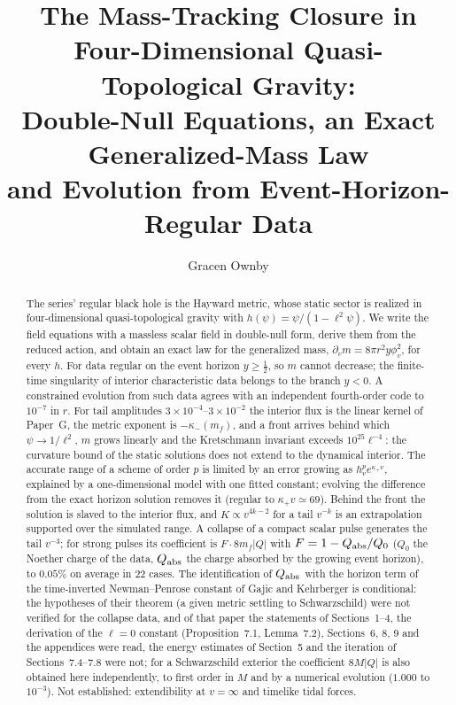 \documentclass[11pt]{article}
\title{The Mass-Tracking Closure in Four-Dimensional Quasi-Topological Gravity:\\
Double-Null Equations, an Exact Generalized-Mass Law\\
and Evolution from Event-Horizon-Regular Data}
\author{Gracen Ownby}
\date{}
\begin{document}
\maketitle

\begin{abstract}
The series' regular black hole is the Hayward metric, whose static sector is realized in four-dimensional quasi-topological gravity with $h(\psi)=\psi/(1-\ell^{2}\psi)$. We write the field equations with a massless scalar field in double-null form, derive them from the reduced action, and obtain an exact law for the generalized mass, $\partial_vm=8\pi r^{2}y\phi_v^{2}$, for every $h$. For data regular on the event horizon $y\ge\tfrac12$, so $m$ cannot decrease; the finite-time singularity of interior characteristic data belongs to the branch $y<0$. A constrained evolution from such data agrees with an independent fourth-order code to $10^{-7}$ in $r$. For tail amplitudes $3\times10^{-4}$--$3\times10^{-2}$ the interior flux is the linear kernel of Paper~G, the metric exponent is $-\kappa_-(m_f)$, and a front arrives behind which $\psi\to1/\ell^{2}$, $m$ grows linearly and the Kretschmann invariant exceeds $10^{25}\ell^{-4}$: the curvature bound of the static solutions does not extend to the dynamical interior. The accurate range of a scheme of order $p$ is limited by an error growing as $h_v^{p}e^{\kappa_+v}$, explained by a one-dimensional model with one fitted constant; evolving the difference from the exact horizon solution removes it (regular to $\kappa_+v\simeq69$). Behind the front the solution is slaved to the interior flux, and $K\propto v^{4k-2}$ for a tail $v^{-k}$ is an extrapolation supported over the simulated range. A collapse of a compact scalar pulse generates the tail $v^{-3}$; for strong pulses its coefficient is $F\cdot8m_f|Q|$ with $F=1-Q_{\rm abs}/Q_0$ ($Q_0$ the Noether charge of the data, $Q_{\rm abs}$ the charge absorbed by the growing event horizon), to $0.05\%$ on average in $22$ cases. The identification of $Q_{\rm abs}$ with the horizon term of the time-inverted Newman--Penrose constant of Gajic and Kehrberger is conditional: the hypotheses of their theorem (a given metric settling to Schwarzschild) were not verified for the collapse data, and of that paper the statements of Sections~1--4, the derivation of the $\ell=0$ constant (Proposition~7.1, Lemma~7.2), Sections~6, 8, 9 and the appendices were read, the energy estimates of Section~5 and the iteration of Sections~7.4--7.8 were not; for a Schwarzschild exterior the coefficient $8M|Q|$ is also obtained here independently, to first order in $M$ and by a numerical evolution ($1.000$ to $10^{-3}$). Not established: extendibility at $v=\infty$ and timelike tidal forces.
\end{abstract}
\end{document}

